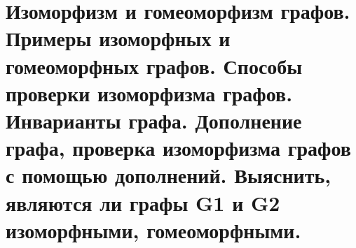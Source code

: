 \section{Изоморфизм и гомеоморфизм графов. Примеры изоморфных и гомеоморфных графов. Способы 
проверки изоморфизма графов. Инварианты графа. Дополнение графа, проверка изоморфизма 
графов с помощью дополнений. Выяснить, являются ли графы G1 и G2 изоморфными, 
гомеоморфными.}